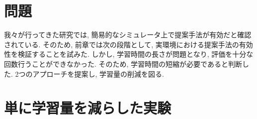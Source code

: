 
\section{問題}
我々が行ってきた研究では, 簡易的なシミュレータ上で提案手法が有効だと確認されている. そのため, 前章では次の段階として, 実環境における提案手法の有効性を検証することを試みた. しかし, 学習時間の長さが問題となり, 評価を十分な回数行うことができなかった. そのため, 学習時間の短縮が必要であると判断した. 2つのアプローチを提案し, 学習量の削減を図る.



\newpage
\section{単に学習量を減らした実験}




